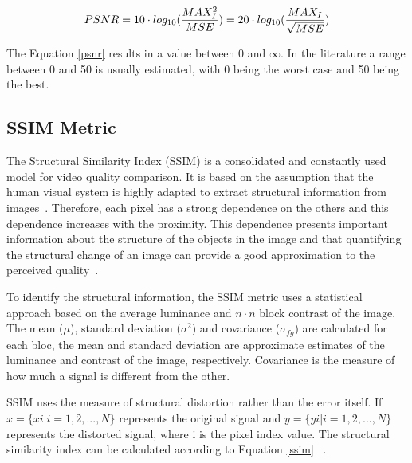 \documentclass[journal]{IEEEtran}
\begin{document}
\begin{equation}
	\centering
	\label{psnr}
	PSNR = 10 \cdot log_{10}(\frac{MAX^{2}_{I}}{MSE}) = 20 \cdot log_{10}(\frac{MAX_{I}}{\sqrt{MSE}})
\end{equation}


The Equation \ref{psnr} results in a value between 0 and $\infty$. In the literature a range between 0 and 50 is usually estimated, with 0 being the worst case and 50 being the best.


\subsection{SSIM Metric}


The Structural Similarity Index (SSIM) is a consolidated and constantly used model for video quality comparison. It is based on the assumption that the human visual system is highly adapted to extract structural information from images~\cite{danilo:12}. Therefore, each pixel has a strong dependence on the others and this dependence increases with the proximity. This dependence presents important information about the structure of the objects in the image and that quantifying the structural change of an image can provide a good approximation to the perceived quality~\cite{Wang:02}.

To identify the structural information, the SSIM metric uses a statistical approach based on the average luminance and $n \cdot n$ block contrast of the image. The mean ($\mu$), standard deviation ($\sigma^{2}$) and covariance ($\sigma_{fg}$) are calculated for each bloc, the mean and standard deviation are approximate estimates of the luminance and contrast of the image, respectively. Covariance is the measure of how much a signal is different from the other.

SSIM uses the measure of structural distortion rather than the error itself. If $x = \{x i | i = 1, 2,. . . , N\}$ represents the original signal and $y = \{y i | i = 1, 2,. . . , N\}$ represents the distorted signal, where i is the pixel index value. The structural similarity index can be calculated according to Equation \ref{ssim} ~\cite{oliveira:16}\cite{Wang:02}.
\end{document}
